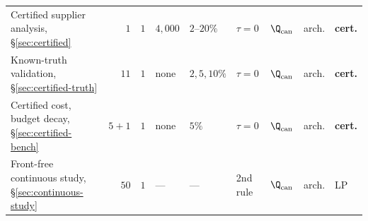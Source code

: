 \begin{tabular}{@{}P{2.6cm}rrP{1.15cm}P{1.5cm}P{1.05cm}P{1.6cm}P{1.15cm}P{1.2cm}@{}}
\midrule
Certified supplier analysis, \S\ref{sec:certified}
 & $1$ & $1$ & $4{,}000$ & $2$--$20\%$ & $\tau=0$ & $\Q_{\mathrm{can}}$ & arch. & \textbf{cert.}\\
\addlinespace[1pt]
Known-truth validation, \S\ref{sec:certified-truth}
 & $11$ & $1$ & none & $2,5,10\%$ & $\tau=0$ & $\Q_{\mathrm{can}}$ & arch. & \textbf{cert.}\\
\addlinespace[1pt]
Certified cost, budget decay, \S\ref{sec:certified-bench}
 & $5{+}1$ & $1$ & none & $5\%$ & $\tau=0$ & $\Q_{\mathrm{can}}$ & arch. & \textbf{cert.}\\
\addlinespace[1pt]
Front-free continuous study, \S\ref{sec:continuous-study}
 & $50$ & $1$ & --- & --- & 2nd rule & $\Q_{\mathrm{can}}$ & arch. & LP\\
\bottomrule
\end{tabular}
